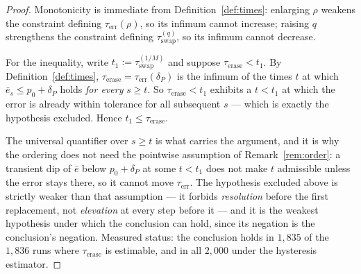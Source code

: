 \begin{proof}
  Monotonicity is immediate from Definition~\ref{def:times}: enlarging $\rho$
  weakens the constraint defining $\tau_{\mathrm{err}}(\rho)$, so its infimum
  cannot increase; raising $q$ strengthens the constraint defining
  $\tau_{\mathrm{swap}}^{(q)}$, so its infimum cannot decrease.

  For the inequality, write $t_1 := \tau_{\mathrm{swap}}^{(1/M)}$ and suppose
  $\tau_{\mathrm{erase}} < t_1$. By Definition~\ref{def:times},
  $\tau_{\mathrm{erase}} = \tau_{\mathrm{err}}(\delta_P)$ is the infimum of the
  times $t$ at which $\bar{e}_s \le p_0 + \delta_P$ holds \emph{for every}
  $s \ge t$. So $\tau_{\mathrm{erase}} < t_1$ exhibits a
  $t < t_1$ at which the error is already within tolerance for all subsequent
  $s$ --- which is exactly the hypothesis excluded. Hence
  $t_1 \le \tau_{\mathrm{erase}}$.

  The universal quantifier over $s \ge t$ is what carries the argument, and it is why the ordering does not need the pointwise assumption of Remark~\ref{rem:order}: a transient dip of $\bar{e}$ below $p_0 + \delta_P$
  at some $t < t_1$ does not make $t$ admissible unless the error stays there,
  so it cannot move $\tau_{\mathrm{err}}$. The hypothesis excluded above is
  strictly weaker than that assumption --- it forbids \emph{resolution} before
  the first replacement, not \emph{elevation} at every step before it --- and it
  is the weakest hypothesis under which the conclusion can hold, since its
  negation is the conclusion's negation. Measured status: the conclusion holds
  in $1{,}835$ of the $1{,}836$ runs where $\tau_{\mathrm{erase}}$ is
  estimable, and in all $2{,}000$ under the hysteresis estimator.
\end{proof}

